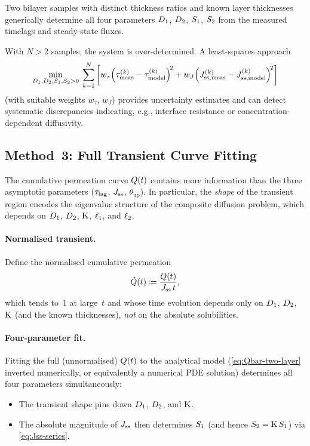 \begin{proposition}
\label{prop:method2-solvability}
Two bilayer samples with distinct thickness ratios and known layer thicknesses
generically determine all four parameters $D_{1}$, $D_{2}$, $S_{1}$,
$S_{2}$ from the measured timelags and steady-state fluxes.
\end{proposition}

\begin{remark}
With $N > 2$ samples, the system is over-determined.  A least-squares approach
\begin{equation}
  \label{eq:method2-lsq}
  \min_{D_{1},D_{2},S_{1},S_{2}>0}\;\sum_{k=1}^{N}
  \left[w_\tau\!\left(\tau^{(k)}_{\mathrm{meas}}
    - \tau^{(k)}_{\mathrm{model}}\right)^{\!2}
  + w_J\!\left(J^{(k)}_{\mathrm{ss,meas}}
    - J^{(k)}_{\mathrm{ss,model}}\right)^{\!2}\right]
\end{equation}
(with suitable weights $w_\tau$, $w_J$) provides uncertainty estimates and can
detect systematic discrepancies indicating, e.g., interface resistance or
concentration-dependent diffusivity.
\end{remark}

\subsection{Method~3: Full Transient Curve Fitting}
\label{sec:method3}

The cumulative permeation curve $Q(t)$ contains more information than the
three asymptotic parameters ($\tau_{\mathrm{lag}}$, $J_{\mathrm{ss}}$, $\theta_{\mathrm{up}}$).  In
particular, the \emph{shape} of the transient region encodes the eigenvalue
structure of the composite diffusion problem, which depends on $D_{1}$,
$D_{2}$, $\mathrm{K}$, $\ell_{1}$, and $\ell_{2}$.

\paragraph{Normalised transient.}
Define the normalised cumulative permeation
\begin{equation}
  \label{eq:normalised-Q}
  \hat{Q}(t) \coloneqq \frac{Q(t)}{J_{\mathrm{ss}}\,t},
\end{equation}
which tends to~$1$ at large~$t$ and whose time evolution depends only on
$D_{1}$, $D_{2}$, $\mathrm{K}$ (and the known thicknesses), \emph{not} on the
absolute solubilities.

\paragraph{Four-parameter fit.}
Fitting the full (unnormalised) $Q(t)$ to the analytical model
(\cref{eq:Qbar-two-layer} inverted numerically, or equivalently a numerical PDE
solution) determines all four parameters simultaneously:
\begin{itemize}
  \item The transient shape pins down $D_{1}$, $D_{2}$, and $\mathrm{K}$.
  \item The absolute magnitude of $J_{\mathrm{ss}}$ then determines $S_{1}$ (and hence
        $S_{2} = \mathrm{K}\,S_{1}$) via \cref{eq:Jss-series}.
\end{itemize}


